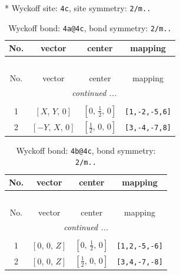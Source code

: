 \documentclass[fleqn,8pt]{jsarticle}
\begin{document}
* Wyckoff site: {\tt 4c}, site symmetry: {\tt 2/m..}
\renewcommand{\arraystretch}{1.2}
\begin{longtable}{cccc}
\caption{Wyckoff bond: {\tt 4a@4c}, bond symmetry: {\tt 2/m..}}
 \\
 \hline \hline
No. & vector & center & mapping \\ \hline \endfirsthead

\multicolumn{3}{l}{\tablename\ \thetable{}} \\
 \hline \hline
No. & vector & center & mapping \\ \hline \endhead

 \hline \hline
\multicolumn{3}{r}{\footnotesize\it continued ...} \\ \endfoot

 \hline \hline
\multicolumn{3}{r}{} \\ \endlastfoot

1 & $\left[ X,\, Y,\, 0 \right]$ & $\left[ 0,\, \frac{1}{2},\, 0 \right]$ & {\tt [1,-2,-5,6]} \\ \hline
2 & $\left[ - Y,\, X,\, 0 \right]$ & $\left[ \frac{1}{2},\, 0,\, 0 \right]$ & {\tt [3,-4,-7,8]} \\
\end{longtable}
\renewcommand{\arraystretch}{1.2}
\begin{longtable}{cccc}
\caption{Wyckoff bond: {\tt 4b@4c}, bond symmetry: {\tt 2/m..}}
 \\
 \hline \hline
No. & vector & center & mapping \\ \hline \endfirsthead

\multicolumn{3}{l}{\tablename\ \thetable{}} \\
 \hline \hline
No. & vector & center & mapping \\ \hline \endhead

 \hline \hline
\multicolumn{3}{r}{\footnotesize\it continued ...} \\ \endfoot

 \hline \hline
\multicolumn{3}{r}{} \\ \endlastfoot

1 & $\left[ 0,\, 0,\, Z \right]$ & $\left[ 0,\, \frac{1}{2},\, 0 \right]$ & {\tt [1,2,-5,-6]} \\ \hline
2 & $\left[ 0,\, 0,\, Z \right]$ & $\left[ \frac{1}{2},\, 0,\, 0 \right]$ & {\tt [3,4,-7,-8]} \\
\end{longtable}
\renewcommand{\arraystretch}{1.2}
\end{document}
